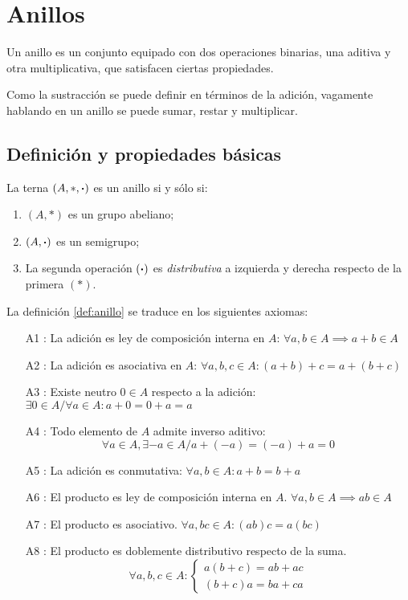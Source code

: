 \section{Anillos}

Un anillo es un conjunto equipado con dos operaciones binarias, una aditiva y otra multiplicativa, que satisfacen ciertas propiedades.

Como la sustracción se puede definir en términos de la adición, vagamente hablando en un anillo se puede sumar, restar y multiplicar.

\subsection{Definición y propiedades básicas}
\vspace{1em}
\begin{fmd-definition}[Anillo] \label{def:anillo}
	La terna $(A, *, \boldsymbol{\cdot})$ es un anillo si y sólo si:
	\begin{enumerate}
		\item $(A, *)$ es un grupo abeliano;
		\item $(A, \boldsymbol{\cdot})$ es un semigrupo;
		\item La segunda operación $(\boldsymbol{\cdot})$ es \textit{distributiva} a izquierda y derecha respecto de la primera $(*)$.
	\end{enumerate}
\end{fmd-definition}

La definición \ref{def:anillo} se traduce en los siguientes axiomas:

\begin{itemize}
	\item[A1]: La adición es ley de composición interna en $A$: $ \forall a, b \in A \implies a + b \in A $
	\item[A2]: La adición es asociativa en $A$: $ \forall a, b, c \in A: (a + b) + c = a + (b + c) $
	\item[A3]: Existe neutro $0 \in A$ respecto a la adición: $\exists 0 \in A / \forall a \in A: a + 0 = 0 + a = a$
	\item[A4]: Todo elemento de $A$ admite inverso aditivo: \[ \forall a \in A, \exists -a \in A / a + (-a) = (-a) + a = 0 \]
	\item[A5]: La adición es conmutativa: $\forall a, b \in A: a + b = b + a$
	\item[A6]: El producto es ley de composición interna en $A$. $\forall a, b \in A \implies ab \in A$
	\item[A7]: El producto es asociativo. $\forall a, b c \in A: (ab)c = a(bc)$
	\item[A8]: El producto es doblemente distributivo respecto de la suma.
	\[ \forall a, b, c \in A: \begin{cases}
		a (b + c) = ab + ac\\
		(b + c) a = ba + ca
	\end{cases} \]
\end{itemize}

